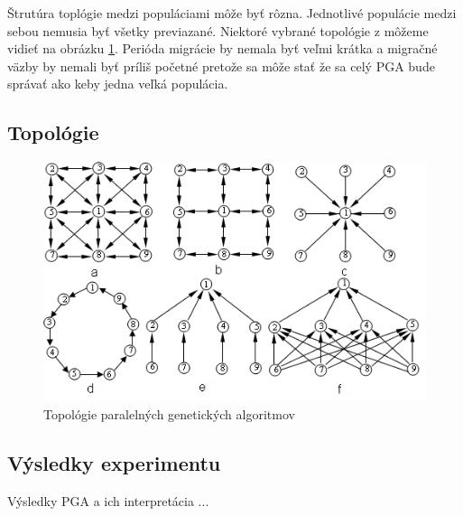 Štrutúra toplógie medzi populáciami môže byť rôzna. Jednotlivé populácie medzi sebou nemusia byť všetky previazané.
Niektoré vybrané topológie z \cite{pea} môžeme vidieť na obrázku \ref{img:topology}.
Perióda migrácie by nemala byť veľmi krátka a migračné väzby by nemali byť príliš početné pretože sa môže stať že sa celý PGA bude správať ako keby jedna veľká populácia.

\subsection{Topológie}

\begin{figure}[!htbp]
  \centering
  \includegraphics[width=\textwidth]{img/topology.png}
  \caption{Topológie paralelných genetických algoritmov}
  \label{img:topology}
\end{figure}
\subsection{Výsledky experimentu}
Výsledky PGA a ich interpretácia
...


